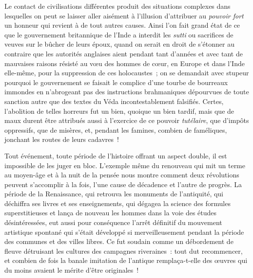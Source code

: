 \documentclass[french,twoside]{book} %
\begin{document}
Le contact de civilisations différentes produit des situations complexes dans lesquelles on peut se laisser aller aisément à l’illusion d’attribuer au \emph{pouvoir fort} un honneur qui revient à de tout autres causes. Ainsi l’on fait grand état de ce que le gouvernement britannique de l’Inde a interdit les \emph{sutti} ou sacrifices de veuves sur le bûcher de leurs époux, quand on serait en droit de s’étonner au contraire que les autorités anglaises aient pendant tant d’années et avec tant de mauvaises raisons résisté au vœu des hommes de cœur, en Europe et dans l’Inde elle-même, pour la suppression de ces holocaustes ; on se demandait avec stupeur pourquoi le gouvernement se  faisait le complice d’une tourbe de bourreaux immondes en n’abrogeant pas des instructions brahmaniques dépourvues de toute sanction autre que des textes du Véda incontestablement falsifiés. Certes, l’abolition de telles horreurs fut un bien, quoique un bien tardif, mais que de maux durent être attribués aussi à l’exercice de ce pouvoir \emph{tutélaire}, que d’impôts oppressifs, que de misères, et, pendant les famines, combien de faméliques, jonchant les routes de leurs cadavres !\par
Tout événement, toute période de l’histoire offrant un aspect double, il est impossible de les juger en bloc. L’exemple même du renouveau qui mit un terme au moyen-âge et à la nuit de la pensée nous montre comment deux révolutions peuvent s’accomplir à la fois,  l’une cause de décadence et l’autre de progrès. La période de la Renaissance, qui retrouva les monuments de l’antiquité, qui déchiffra ses livres et ses enseignements, qui dégagea la science des formules superstitieuses et lança de nouveau les hommes dans la voie des études désintéressées, eut aussi pour conséquence l’arrêt définitif du mouvement artistique spontané qui s’était développé si merveilleusement pendant la période des communes et des villes libres. Ce fut soudain comme un débordement de fleuve détruisant les cultures des campagnes riveraines : tout dut recommencer, et combien de fois la banale imitation de l’antique remplaça-t-elle des œuvres qui du moins avaient le mérite d’être originales !\par
\end{document}
